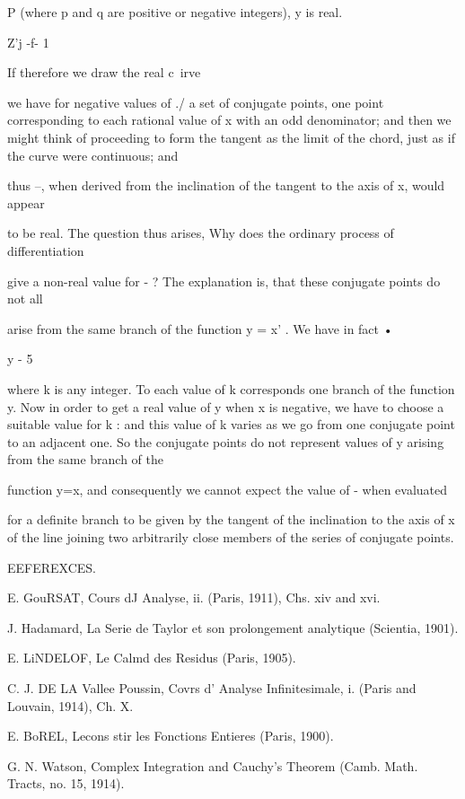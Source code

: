 {{{{P (where p and q are positive or negative integers), y is real.

Z'j -f- 1

If therefore we draw the real c\ irve

we have for negative values of ./ a set of conjugate points, one point
corresponding to each rational value of x with an odd denominator;
and then we might think of proceeding to form the tangent as the limit
of the chord, just as if the curve were continuous; and

thus --, when derived from the inclination of the tangent to the axis
of x, would appear

to be real. The question thus arises, Why does the ordinary process of
differentiation

give a non-real value for - ? The explanation is, that these conjugate
points do not all

arise from the same branch of the function y = x' . We have in fact •

y - 5

where k is any integer. To each value of k corresponds one branch of
the function y. Now in order to get a real value of y when x is
negative, we have to choose a suitable value for k : and this value of
k varies as we go from one conjugate point to an adjacent one. So the
conjugate points do not represent values of y arising from the same
branch of the

function y=x, and consequently we cannot expect the value of - when
evaluated

for a definite branch to be given by the tangent of the inclination to
the axis of x of the line joining two arbitrarily close members of the
series of conjugate points.

%
%

EEFEREXCES.

E. GouRSAT, Cours dJ Analyse, ii. (Paris, 1911), Chs. xiv and xvi.

J. Hadamard, La Serie de Taylor et son prolongement analytique
(Scientia, 1901).

E. LiNDELOF, Le Calmd des Residus (Paris, 1905).

C. J. DE LA Vallee Poussin, Covrs d' Analyse Infinitesimale, i. (Paris
and Louvain, 1914), Ch. X.

E. BoREL, Lecons stir les Fonctions Entieres (Paris, 1900).

G. N. Watson, Complex Integration and Cauchy's Theorem (Camb. Math.
Tracts, no. 15, 1914).

}}}}
